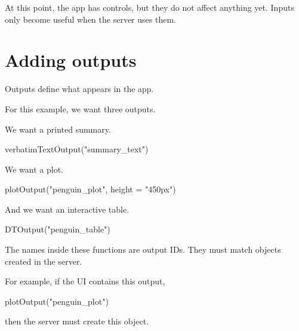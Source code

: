 \documentclass[
  letterpaper,
  DIV=11,
  numbers=noendperiod]{scrreprt}
\newenvironment{Shaded}{\begin{snugshade}}{\end{snugshade}}
\newcommand{\AttributeTok}[1]{\textcolor[rgb]{0.40,0.45,0.13}{#1}}
\newcommand{\CommentTok}[1]{\textcolor[rgb]{0.37,0.37,0.37}{#1}}
\newcommand{\FunctionTok}[1]{\textcolor[rgb]{0.28,0.35,0.67}{#1}}
\newcommand{\NormalTok}[1]{\textcolor[rgb]{0.00,0.23,0.31}{#1}}
\newcommand{\OtherTok}[1]{\textcolor[rgb]{0.00,0.23,0.31}{#1}}
\newcommand{\SpecialCharTok}[1]{\textcolor[rgb]{0.37,0.37,0.37}{#1}}
\newcommand{\StringTok}[1]{\textcolor[rgb]{0.13,0.47,0.30}{#1}}
\begin{document}
At this point, the app has controls, but they do not affect anything
yet. Inputs only become useful when the server uses them.

\section{Adding outputs}\label{adding-outputs}

Outputs define what appears in the app.

For this example, we want three outputs.

We want a printed summary.

\begin{Shaded}
\begin{Highlighting}[]
\FunctionTok{verbatimTextOutput}\NormalTok{(}\StringTok{"summary\_text"}\NormalTok{)}
\end{Highlighting}
\end{Shaded}

We want a plot.

\begin{Shaded}
\begin{Highlighting}[]
\FunctionTok{plotOutput}\NormalTok{(}\StringTok{"penguin\_plot"}\NormalTok{, }\AttributeTok{height =} \StringTok{"450px"}\NormalTok{)}
\end{Highlighting}
\end{Shaded}

And we want an interactive table.

\begin{Shaded}
\begin{Highlighting}[]
\FunctionTok{DTOutput}\NormalTok{(}\StringTok{"penguin\_table"}\NormalTok{)}
\end{Highlighting}
\end{Shaded}

The names inside these functions are output IDs. They must match objects
created in the server.

For example, if the UI contains this output,

\begin{Shaded}
\begin{Highlighting}[]
\FunctionTok{plotOutput}\NormalTok{(}\StringTok{"penguin\_plot"}\NormalTok{)}
\end{Highlighting}
\end{Shaded}

then the server must create this object.

\begin{Shaded}
\end{Shaded}
\end{document}
